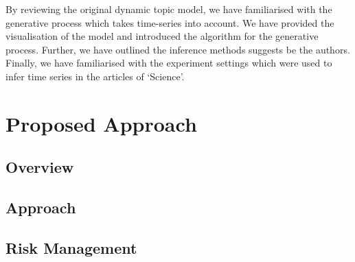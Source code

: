 \documentclass{mprop}
\begin{document}
\par By reviewing the original dynamic topic model, we have familiarised with the generative process which takes time-series into account. We have provided the visualisation of the model and introduced the algorithm for the generative process. Further, we have outlined the inference methods suggests be the authors. Finally, we have familiarised with the experiment settings which were used to infer time series in the articles of `Science'. 

\par

\section{Proposed Approach}

\par

\subsection{Overview}

\par

\subsection{Approach}

\par

\par

\par

\subsection{Risk Management}
\end{document}
